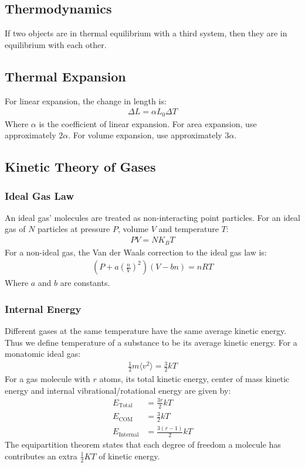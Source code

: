 \documentclass[a4paper]{article}
\newcommand{\ave}[1]{
  \ensuremath{\langle #1 \rangle}}     %
\begin{document}
\begin{multicols*}{2}
\section{Thermodynamics}
If two objects are in thermal equilibrium with a third system, then they are in
equilibrium with each other.
\subsection{Thermal Expansion}
For linear expansion, the change in length is:
\begin{align*}
  \Delta L = \alpha L_0 \Delta T
\end{align*}
Where $\alpha$ is the coefficient of linear expansion. For area expansion, use
approximately $2 \alpha $. For volume expansion, use approximately $3 \alpha$.
\subsection{Kinetic Theory of Gases}
\subsubsection{Ideal Gas Law}
An ideal gas' molecules are treated as non-interacting point particles. For an
ideal gas of $N$ particles at pressure $P$, volume $V$ and temperature $T$:
\begin{align*}
  PV = NK_BT
\end{align*}
For a non-ideal gas, the Van der Waals correction to the ideal gas law is:
\begin{align*}
  \left( P + a \left(\frac{n}{V}\right) ^2 \right) \left( V - bn\right) = nRT
\end{align*}
Where $a$ and $b$ are constants.
\subsubsection{Internal Energy}
Different gases at the same temperature have the same average kinetic
energy. Thus we define temperature of a substance to be its average kinetic
energy. For a monatomic ideal gas:
\begin{align*}
  \frac{1}{2}m\ave{ v^2 } = \frac{3}{2}kT
\end{align*}
\noindent
For a gas molecule with $r$ atoms, its total kinetic energy, center of mass
kinetic energy and internal vibrational/rotational energy are given by:
\begin{align*}
  E_{\text{Total}} &= \frac{3r}{2}kT \\
  E_{\text{COM}} &= \frac{3}{2}kT \\
  E_{\text{Internal}} &= \frac{3(r-1)}{2}kT
\end{align*}
\noindent
The equipartition theorem states that each degree of freedom a molecule has
contributes an extra $\frac{1}{2}KT$ of kinetic energy.

\end{multicols*}
\end{document}
